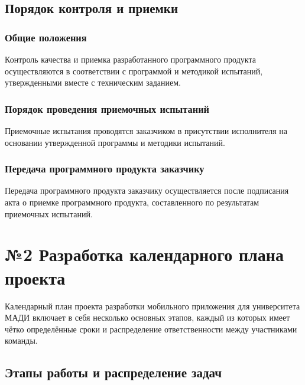 \documentclass[a4paper,12pt]{article}
\begin{document}
\subsection{Порядок контроля и приемки}
\subsubsection{Общие положения}
Контроль качества и приемка разработанного программного продукта осуществляются в соответствии с программой и методикой испытаний, утвержденными вместе с техническим заданием.

\subsubsection{Порядок проведения приемочных испытаний}
Приемочные испытания проводятся заказчиком в присутствии исполнителя на основании утвержденной программы и методики испытаний.

\subsubsection{Передача программного продукта заказчику}
Передача программного продукта заказчику осуществляется после подписания акта о приемке программного продукта, составленного по результатам приемочных испытаний.

\section{№2 Разработка календарного плана проекта}

Календарный план проекта разработки мобильного приложения для университета МАДИ включает в себя несколько основных этапов, каждый из которых имеет чётко определённые сроки и распределение ответственности между участниками команды.

\subsection{Этапы работы и распределение задач}
\end{document}
